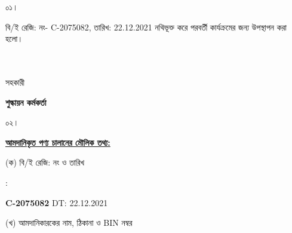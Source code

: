 \documentclass[12pt]{article}
\newcommand{\beno}{C-2075082}
\newcommand{\bedt}{22.12.2021}
\begin{document}
\noindent
\begin{minipage}[t]{0.05\linewidth}
০১।
\end{minipage}
\begin{minipage}[t]{0.95\linewidth}
বি/ই রেজি: নং- {\beno}, তারিখ: {\bedt}
নথিভূক্ত করে
পরবর্তী কার্যক্রমের জন্য উপস্থাপন করা হলো।
\\
\\
\\
\end{minipage}
\begin{minipage}[t]{0.05\linewidth}
\hspace*{0em}
\end{minipage}
\begin{minipage}[t]{0.05\linewidth}
সহকারী
\end{minipage}
\begin{minipage}[t]{0.37\linewidth}
\hspace{0em}
\end{minipage}
\begin{minipage}[t]{0.53\linewidth}
\textbf{শুল্কায়ন কর্মকর্তা}
\\
\end{minipage}
\begin{minipage}[t]{0.05\linewidth}
০২।
\end{minipage}
\begin{minipage}[t]{0.95\linewidth}
\underline{\textbf {আমদানিকৃত পণ্য চালানের
মৌলিক তথ্য:}}
\\
\end{minipage}
\footnotesize
\begin{minipage}[t]{0.05\linewidth}
\hspace*{1em}
\end{minipage}
\begin{minipage}[t]{0.40\linewidth}
(ক) বি/ই রেজি: নং ও তারিখ
\end{minipage}
\begin{minipage}[t]{0.02\linewidth}
:
\end{minipage}
\begin{minipage}[t]{0.53\linewidth}
\textbf{{\beno}} \hspace{2em} DT: {\bedt}
\\
\end{minipage}
\begin{minipage}[t]{0.05\linewidth}
\hspace*{1em}
\end{minipage}
\begin{minipage}[t]{0.40\linewidth}
(খ) আমদানিকারকের নাম, ঠিকানা
ও BIN নম্বর
\end{minipage}
\end{document}
